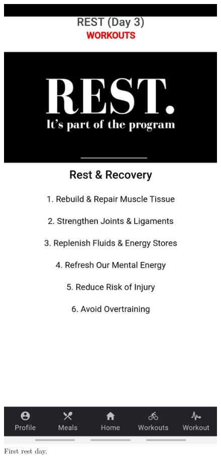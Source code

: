 \documentclass[a4paper,12pt]{report}
\begin{document}
\begin{figure}[ht]
\begin{minipage}[b]{0.5\linewidth}
    \includegraphics[width=.7\linewidth]{images/aplicationImages/restDay1.jpeg} 
    \caption{First rest day.} 
    \vspace{4ex}
  \end{minipage}%
  \begin{minipage}[b]{0.5\linewidth}
    \centering

\end{minipage}
\end{figure}
\end{document}
